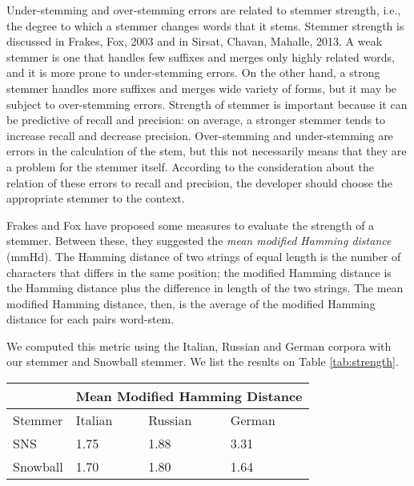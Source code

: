 Under-stemming and over-stemming errors are related to stemmer strength, i.e., the degree to which a stemmer changes words that it stems. Stemmer strength is discussed in Frakes, Fox, 2003\cite{frakes} and in Sirsat, Chavan, Mahalle, 2013\cite{sirsat}. A weak stemmer is one that handles few suffixes and merges only highly related words, and it is more prone to under-stemming errors. On the other hand, a strong stemmer handles more suffixes and merges wide variety of forms, but it may be subject to over-stemming errors. Strength of stemmer is important because it can be
predictive of recall and precision: on average, a stronger stemmer tends to increase recall and decrease precision. Over-stemming and under-stemming are errors in the calculation of the stem, but this not necessarily means that they are a problem for the stemmer itself. According to the consideration about the relation of these errors to recall and precision, the developer should choose the appropriate stemmer to the context. 

Frakes and Fox have proposed some measures to evaluate the strength of a stemmer. Between these, they suggested the \emph{mean modified Hamming distance} (mmHd). The Hamming distance of two strings of equal length is the number of characters that differs in the same position; the modified Hamming distance is the Hamming distance plus the difference in length of the two strings. The mean modified Hamming distance, then, is the average of the modified Hamming distance for each pairs word-stem.

We computed this metric using the Italian, Russian and German corpora with our stemmer and Snowball stemmer. We list the results on Table \ref{tab:strength}.

\begin{center}
   \begin{tabular}{| l | l | l | l |}
    \hline
    & \multicolumn{3}{l|}{\textbf{Mean Modified Hamming Distance}}\\ \hline
    Stemmer & Italian & Russian & German\\ \hline
    SNS & 1.75 & 1.88 & 3.31 \\ \hline
    Snowball & 1.70 & 1.80 & 1.64\\ \hline    
    \end{tabular}
    \label{tab:strength}
\end{center}


